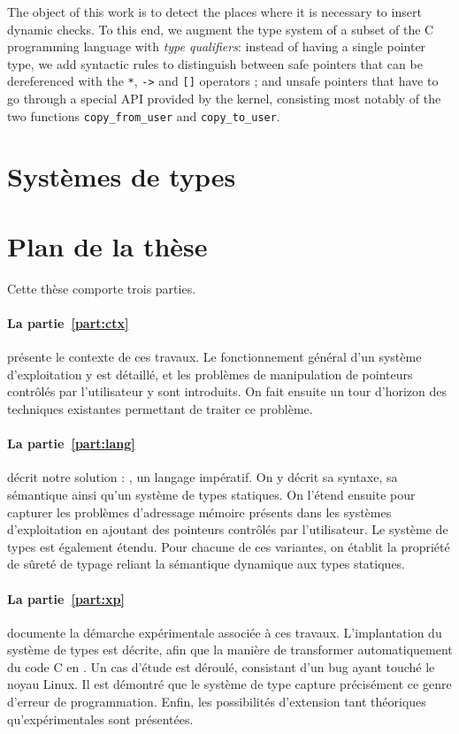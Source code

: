The object of this work is to detect the places where it is necessary to insert
dynamic checks. To this end, we augment the type system of a subset of the C
programming language with \emph{type qualifiers}: instead of having a single
pointer type, we add syntactic rules to distinguish between safe pointers that
can be dereferenced with the \texttt{*}, \texttt{->} and \texttt{[]} operators ;
and unsafe pointers that have to go through a special API provided by the
kernel, consisting most notably of the two functions \texttt{copy\_from\_user}
and \texttt{copy\_to\_user}.

\section{Systèmes de types}

\section{Plan de la thèse}

Cette thèse comporte trois parties.

\paragraph{La partie~\ref{part:ctx}} présente le contexte de ces travaux. Le
fonctionnement général d'un système d'exploitation y est détaillé, et les
problèmes de manipulation de pointeurs contrôlés par l'utilisateur y sont
introduits. On fait ensuite un tour d'horizon des techniques existantes
permettant de traiter ce problème.

\paragraph{La partie~\ref{part:lang}} décrit notre solution : \langname, un
langage impératif. On y décrit sa syntaxe, sa sémantique ainsi qu'un système de
types statiques. On l'étend ensuite pour capturer les problèmes d'adressage
mémoire présents dans les systèmes d'exploitation en ajoutant des pointeurs
contrôlés par l'utilisateur. Le système de types est également étendu. Pour
chacune de ces variantes, on établit la propriété de sûreté de typage reliant la
sémantique dynamique aux types statiques.

\paragraph{La partie~\ref{part:xp}} documente la démarche expérimentale associée
à ces travaux. L'implantation du système de types est décrite, afin que la
manière de transformer automatiquement du code C en \langname. Un cas d'étude
est déroulé, consistant d'un bug ayant touché le noyau Linux. Il est démontré
que le système de type capture précisément ce genre d'erreur de programmation.
Enfin, les possibilités d'extension tant théoriques qu'expérimentales sont
présentées.



